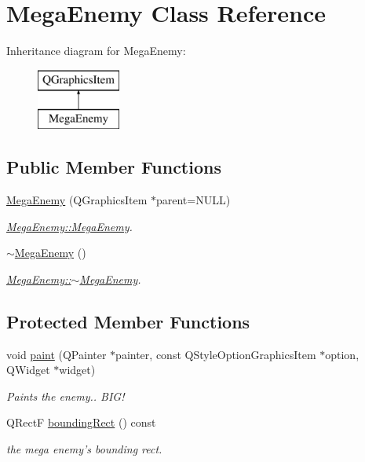 \hypertarget{class_mega_enemy}{\section{Mega\-Enemy Class Reference}
\label{class_mega_enemy}
}
Inheritance diagram for Mega\-Enemy\-:\begin{figure}[H]
\begin{center}
\leavevmode
\includegraphics[height=2.000000cm]{class_mega_enemy}
\end{center}
\end{figure}
\subsection*{Public Member Functions}
\begin{DoxyCompactItemize}
\item 
\hyperlink{class_mega_enemy_aa7016a1be5acff2fb9aa38dac872e8ff}{Mega\-Enemy} (Q\-Graphics\-Item $\ast$parent=N\-U\-L\-L)
\begin{DoxyCompactList}\small\item\em \hyperlink{class_mega_enemy_aa7016a1be5acff2fb9aa38dac872e8ff}{Mega\-Enemy\-::\-Mega\-Enemy}. \end{DoxyCompactList}\item 
\hypertarget{class_mega_enemy_a48f76a1191d94ab17876b82c18443016}{\hyperlink{class_mega_enemy_a48f76a1191d94ab17876b82c18443016}{$\sim$\-Mega\-Enemy} ()}\label{class_mega_enemy_a48f76a1191d94ab17876b82c18443016}

\begin{DoxyCompactList}\small\item\em \hyperlink{class_mega_enemy_a48f76a1191d94ab17876b82c18443016}{Mega\-Enemy\-::$\sim$\-Mega\-Enemy}. \end{DoxyCompactList}\end{DoxyCompactItemize}
\subsection*{Protected Member Functions}
\begin{DoxyCompactItemize}
\item 
void \hyperlink{class_mega_enemy_a23192e1d8461ab93f8ea3ec31dfb439f}{paint} (Q\-Painter $\ast$painter, const Q\-Style\-Option\-Graphics\-Item $\ast$option, Q\-Widget $\ast$widget)
\begin{DoxyCompactList}\small\item\em Paints the enemy.. B\-I\-G! \end{DoxyCompactList}\item 
Q\-Rect\-F \hyperlink{class_mega_enemy_aef6f1948a790e170814074502dc84650}{bounding\-Rect} () const 
\begin{DoxyCompactList}\small\item\em the mega enemy's bounding rect. \end{DoxyCompactList}\end{DoxyCompactItemize}


